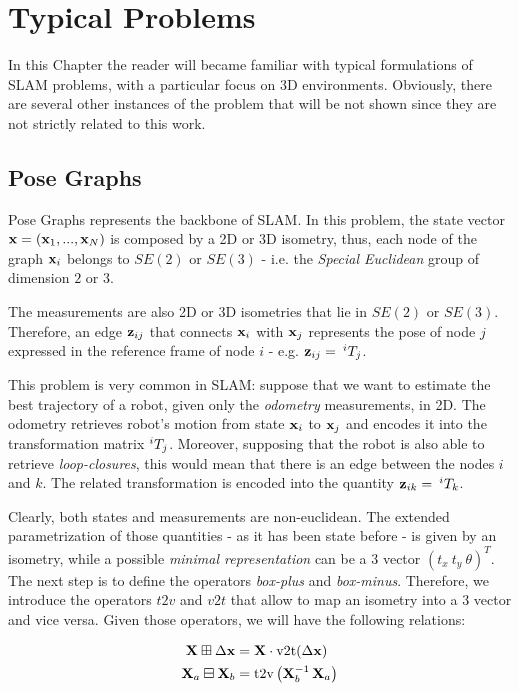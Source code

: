 \chapter{Typical Problems}\label{ch:problems}
In this Chapter the reader will became familiar with typical formulations of SLAM problems, with a particular focus on 3D environments. Obviously, there are several other instances of the problem that will be not shown since they are not strictly related to this work.

\section{Pose Graphs}\label{sec:pose_graphs}
Pose Graphs represents the backbone of SLAM. In this problem, the state vector $\mathbf{x} = \left(\mathbf{x}_1, ..., \mathbf{x}_N\right)$ is composed by a 2D or 3D isometry, thus, each node of the graph $\mathbf{x}_i$ belongs to $SE(2)$ or $SE(3)$ - i.e. the \textit{Special Euclidean} group of dimension $2$ or $3$.

The measurements are also 2D or 3D isometries that lie in $SE(2)$ or $SE(3)$. Therefore, an edge $\mathbf{z}_{ij}$ that connects $\mathbf{x}_i$ with $\mathbf{x}_j$ represents the pose of node $j$ expressed in the reference frame of node $i$ - e.g. $\mathbf{z}_{ij} =\: ^{i}T_{j}$. 

This problem is very common in SLAM: suppose that we want to estimate the best trajectory of a robot, given only the \textit{odometry} measurements, in 2D. The odometry retrieves robot's motion from state $\mathbf{x}_i$ to $\mathbf{x}_j$ and encodes it into the transformation matrix $^{i}T_{j}$. Moreover, supposing that the robot is also able to retrieve \textit{loop-closures}, this would mean that there is an edge between the nodes $i$ and $k$. The related transformation is encoded into the quantity $\mathbf{z}_{ik} =\: ^{i}T_{k}$.

Clearly, both states and measurements are non-euclidean. The extended parametrization of those quantities - as it has been state before - is given by an isometry, while a possible \textit{minimal representation} can be a $3$ vector $(t_{x}\: t_{y}\: \theta)^T$. The next step is to define the operators \textit{box-plus} and \textit{box-minus}. Therefore, we introduce the operators $t2v$ and $v2t$ that allow to map an isometry into a $3$ vector and vice versa. Given those operators, we will have the following relations:

\begin{align}
    \label{eq:boxplus_se2}
    \SState \boxplus \dx &= \SState \cdot \v2t(\dx)\\
    \label{eq:boxminus_se2}
    \SState_a \boxminus \SState_b &= \text{t2v}\left(\SState_b^{-1} \, \SState_a\right)
\end{align}

